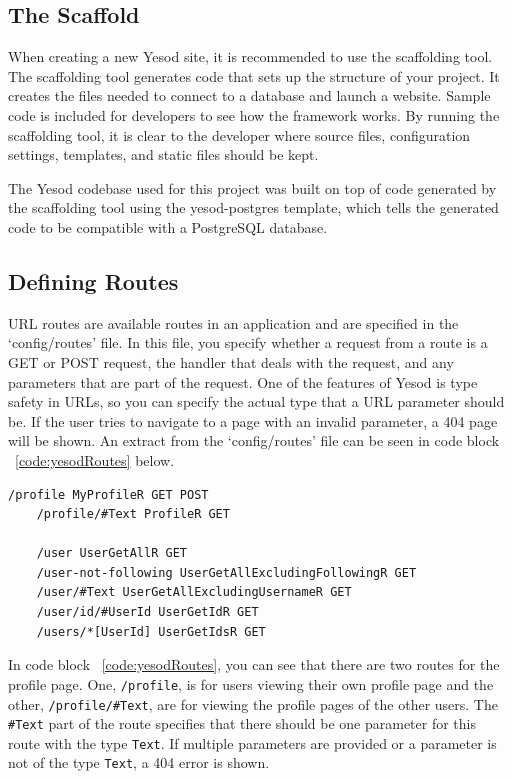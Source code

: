 \subsection{The Scaffold}
When creating a new Yesod site, it is recommended to use the scaffolding tool.
The scaffolding tool generates code that sets up the structure of your project. It
creates the files needed to connect to a database and launch a website. Sample code
is included for developers to see how the framework works. By running the scaffolding
tool, it is clear to the developer where source files, configuration settings, templates, and 
static files should be kept. \parencite[Scaffolding and the Site Template]{yesodBook}

The Yesod codebase used for this project was built on top of code generated by the
scaffolding tool using the yesod-postgres template, which tells the generated code
to be compatible with a PostgreSQL database.

\subsection{Defining Routes}

URL routes are available routes in an application and are specified in the 
`config/routes' file. In this file, you specify whether a request from a route is a
GET or POST request, the handler that deals with the request, and any parameters
that are part of the request. One of the features of Yesod is type safety in URLs,
so you can specify the actual type that a URL parameter should be. If the user
tries to navigate to a page with an invalid parameter, a 404 page will be shown.
An extract from the `config/routes' file can be seen in code block 
~\ref{code:yesodRoutes} below.


\begin{lstlisting}[caption={Yesod URL routes},label={code:yesodRoutes}]
	/profile MyProfileR GET POST
	/profile/#Text ProfileR GET
	
	/user UserGetAllR GET
	/user-not-following UserGetAllExcludingFollowingR GET
	/user/#Text UserGetAllExcludingUsernameR GET
	/user/id/#UserId UserGetIdR GET
	/users/*[UserId] UserGetIdsR GET
\end{lstlisting}

In code block ~\ref{code:yesodRoutes}, you can see that there
are two routes for the profile page. One, \texttt{/profile}, is for users
viewing their own profile page and the other, \texttt{/profile/\#Text}, are
for viewing the profile pages of the other users. The \texttt{\#Text} part
of the route specifies that there should be one parameter for this
route with the type \texttt{Text}. If multiple parameters are provided or a parameter
is not of the type \texttt{Text}, a 404 error is shown.

